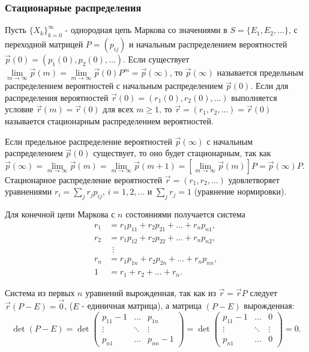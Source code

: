 \subsubsection*{Стационарные распределения}

Пусть $\{X_k\}_{k=0}^\infty$ - однородная цепь Маркова со значениями в $S=\{E_1,E_2,...\}$, с переходной матрицей $P=(p_{ij})$ и начальным распределением вероятностей $\vec p(0)=(p_1(0),p_2(0),...)$.
Если существует $\lim\limits_{m \to \infty} \vec{p}(m) = \lim\limits_{m \to \infty} \vec p (0) P^m = \vec p (\infty )$, то $\vec p (\infty)$ называется предельным распределением вероятностей с начальным распределением $\vec p (0)$.
Если для распределения вероятностей $\vec r (0) = (r_1(0),r_2(0),...)$ выполняется условие $\vec r (m)=\vec r(0)$ для всех $m \geq 1$, то $\vec r = (r_1,r_2,...)=\vec r(0)$ называется стационарным распределением вероятностей.

Если  предельное распределение вероятностей $\vec p (\infty)$ с начальным распределением $\vec p(0)$ существует, то оно будет стационарным, так как $\vec p(\infty)= \lim\limits_{m\to \infty } \vec p (m)= \lim\limits_{m \to \infty} \vec p (m+1) = [\lim\limits_{m \to \infty } \vec p (m)]P = \vec p (\infty ) P$.
Стационарное распределение вероятностей $\vec r = (r_1,r_2,...)$ удовлетворяет уравнениями $r_i=\sum_j r_j p_{ij}$, $i=1,2,...$ и $\sum_j r_j=1$ (уравнение нормировки).

Для конечной цепи Маркова с $n$ состояниями получается система
\[
	\begin{aligned}
		r_1 & = r_1 p_{11} + r_2 p_{21} + \dots + r_n p_{n1}, \\
		r_2 & = r_1 p_{12} + r_2 p_{22} + \dots + r_n p_{n2}, \\
		    & \ \ \vdots                                      \\
		r_n & = r_1 p_{1n} + r_2 p_{2n} + \dots + r_n p_{nn}, \\
		1   & = r_1 + r_2 + \dots + r_n.
	\end{aligned}
\]

Система из первых $n$ уравнений вырожденная, так как из $\vec{r} = \vec{r}P$
следует
$\vec{r}(P - E) = \vec{0}$, ($E$ - единичная матрица),
а матрица $(P - E)$ вырожденная:
\[
	\det(P - E) =
	\det \begin{pmatrix}
		p_{11} - 1 & \dots  & p_{1n}     \\
		\vdots     & \ddots & \vdots     \\
		p_{n1}     & \dots  & p_{nn} - 1
	\end{pmatrix}
	=
	\det \begin{pmatrix}
		p_{11} - 1 & \dots  & 0      \\
		\vdots     & \ddots & \vdots \\
		p_{n1}     & \dots  & 0
	\end{pmatrix}
	= 0.
\]

